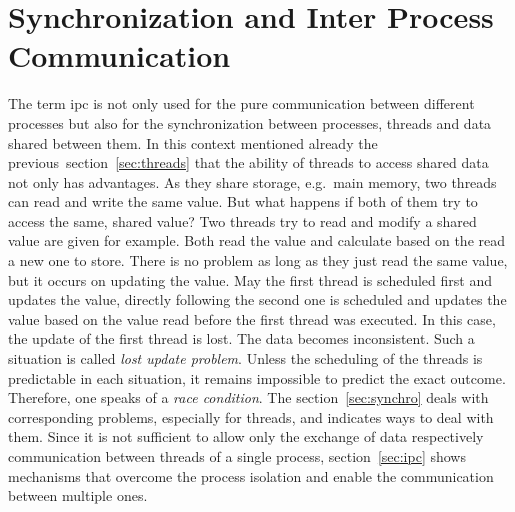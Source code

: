 \section{Synchronization and Inter Process Communication}\label{sec:ipc-and-synchro}
The term \acf{ipc} is not only used for the pure communication between different processes but also for the synchronization between processes, threads and data shared between them.
In this context mentioned already the previous~section~\ref{sec:threads} that the ability of threads to access shared data not only has advantages.
As they share storage, e.g.\ main memory, two threads can read and write the same value.
But what happens if both of them try to access the same, shared value?
Two threads try to read and modify a shared value are given for example.
Both read the value and calculate based on the read a new one to store. 
There is no problem as long as they just read the same value, but it occurs on updating the value.
May the first thread is scheduled first and updates the value, directly following the second one is scheduled and updates the value based on the value read before the first thread was executed.
In this case, the update of the first thread is lost. 
The data becomes inconsistent.
Such a situation is called \textit{lost update problem}\cite{glatz2015betriebssysteme}.
Unless the scheduling of the threads is predictable in each situation, it remains impossible to predict the exact outcome.
Therefore, one speaks of a \textit{race condition}\cite{tanenbaum-modern-operating-systems}.
The section~\ref{sec:synchro} deals with corresponding problems, especially for threads, and indicates ways to deal with them.
Since it is not sufficient to allow only the exchange of data respectively communication between threads of a single process, section~\ref{sec:ipc} shows mechanisms that overcome the process isolation and enable the communication between multiple ones.

